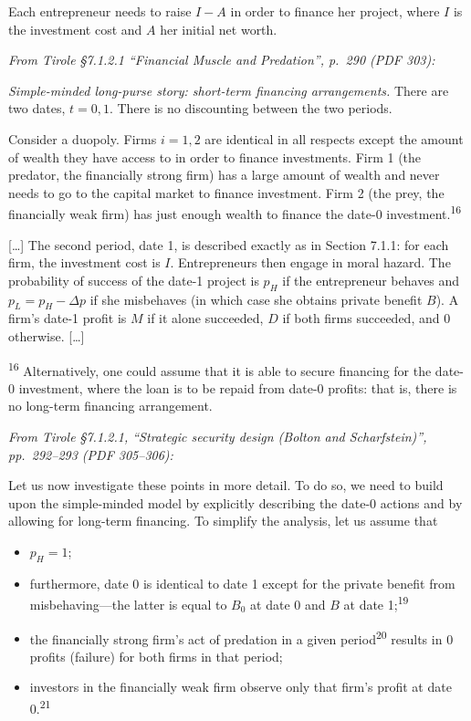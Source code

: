 \documentclass[11pt,a4paper]{article}
\providecommand{\tightlist}{\setlength{\itemsep}{0pt}\setlength{\parskip}{0pt}}
\begin{document}
Each entrepreneur needs to raise \(I - A\) in order to finance her project, where \(I\) is the
investment cost and \(A\) her initial net worth.

\emph{From Tirole §7.1.2.1 ``Financial Muscle and Predation'', p.~290 (PDF 303):}

\emph{Simple-minded long-purse story: short-term financing arrangements.} There are two dates,
\(t = 0, 1\). There is no discounting between the two periods.

Consider a duopoly. Firms \(i = 1, 2\) are identical in all respects except the amount of wealth
they have access to in order to finance investments. Firm 1 (the predator, the financially strong
firm) has a large amount of wealth and never needs to go to the capital market to finance
investment. Firm 2 (the prey, the financially weak firm) has just enough wealth to finance the
date-0 investment.\textsuperscript{16}

{[}\ldots{]} The second period, date 1, is described exactly as in Section 7.1.1: for each firm, the
investment cost is \(I\). Entrepreneurs then engage in moral hazard. The probability of success of
the date-1 project is \(p_H\) if the entrepreneur behaves and \(p_L = p_H - \Delta p\) if she
misbehaves (in which case she obtains private benefit \(B\)). A firm's date-1 profit is \(M\) if it
alone succeeded, \(D\) if both firms succeeded, and 0 otherwise. {[}\ldots{]}

\textsuperscript{16} Alternatively, one could assume that it is able to secure financing for the
date-0 investment, where the loan is to be repaid from date-0 profits: that is, there is no
long-term financing arrangement.

\emph{From Tirole §7.1.2.1, ``Strategic security design (Bolton and Scharfstein)'', pp.~292--293
(PDF 305--306):}

Let us now investigate these points in more detail. To do so, we need to build upon the
simple-minded model by explicitly describing the date-0 actions and by allowing for long-term
financing. To simplify the analysis, let us assume that

\begin{itemize}
\tightlist
\item
  \(p_H = 1\);
\item
  furthermore, date 0 is identical to date 1 except for the private benefit from misbehaving---the
  latter is equal to \(B_0\) at date 0 and \(B\) at date 1;\textsuperscript{19}
\item
  the financially strong firm's act of predation in a given period\textsuperscript{20} results in 0
  profits (failure) for both firms in that period;
\item
  investors in the financially weak firm observe only that firm's profit at date
  0.\textsuperscript{21}
\end{itemize}
\end{document}
